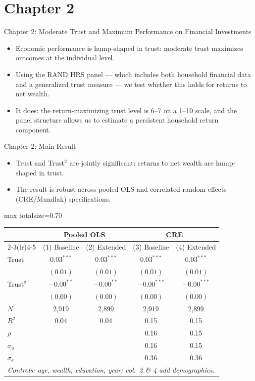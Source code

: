 \documentclass{beamer}
\newcommand{\slidetable}[1]{%
  \begin{center}
  \begin{adjustbox}{max totalsize={\textwidth}{0.70\textheight}}
  #1
  \end{adjustbox}
  \end{center}
}
\begin{document}
\section{Chapter 2}

\begin{frame}{Chapter 2: Moderate Trust and Maximum Performance on Financial Investments}
  \begin{itemize}
    \item Economic performance is hump-shaped in trust: moderate trust maximizes outcomes at the individual level.
    \item Using the RAND HRS panel --- which includes both household financial data and a generalized trust measure --- we test whether this holds for returns to net wealth.
    \item It does: the return-maximizing trust level is 6--7 on a 1--10 scale, and the panel structure allows us to estimate a persistent household return component.
  \end{itemize}
\end{frame}

\begin{frame}[label=ch2-results]{Chapter 2: Main Result}
  \scriptsize
  \begin{itemize}
    \item Trust and Trust$^2$ are jointly significant: returns to net wealth are hump-shaped in trust.
    \item The result is robust across pooled OLS and correlated random effects (CRE/Mundlak) specifications.
  \end{itemize}
  \vspace{0.2em}
  \slidetable{
  \begin{tabular}{lcccc}
    \toprule
    & \multicolumn{2}{c}{Pooled OLS} & \multicolumn{2}{c}{CRE} \\
    \cmidrule(lr){2-3}\cmidrule(lr){4-5}
    & (1) Baseline & (2) Extended & (3) Baseline & (4) Extended \\
    \midrule
    Trust     & $0.03^{***}$ & $0.03^{***}$ & $0.03^{***}$ & $0.03^{***}$ \\
              & $(0.01)$     & $(0.01)$     & $(0.01)$     & $(0.01)$     \\
    Trust$^2$ & $-0.00^{**}$ & $-0.00^{**}$ & $-0.00^{***}$& $-0.00^{***}$\\
              & $(0.00)$     & $(0.00)$     & $(0.00)$     & $(0.00)$     \\
    \midrule
    $N$            & 2{,}919 & 2{,}899 & 2{,}919 & 2{,}899 \\
    $R^2$          & 0.04    & 0.04    & 0.15    & 0.15    \\
    $\rho$         &         &         & 0.16    & 0.15    \\
    $\sigma_u$     &         &         & 0.16    & 0.15    \\
    $\sigma_e$     &         &         & 0.36    & 0.36    \\
    \bottomrule
    \multicolumn{5}{l}{\textit{Controls: age, wealth, education, year; col.\ 2 \& 4 add demographics.}}
  \end{tabular}}
\end{frame}
\end{document}
